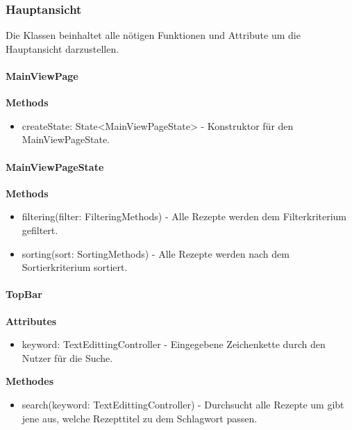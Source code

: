 \documentclass[parskip=full]{scrartcl}
\begin{document}
\newpage

\subsubsection{Hauptansicht}
        Die Klassen beinhaltet alle nötigen Funktionen und Attribute um die Hauptansicht darzustellen.\newline

        \paragraph{MainViewPage}
            \textbf{Methods}
                \begin{itemize}
                    \item createState: State<MainViewPageState> - Konstruktor für den MainViewPageState.
                \end{itemize}
                
        \paragraph{MainViewPageState}
            \textbf{Methods}
                \begin{itemize}
                    \item filtering(filter: FilteringMethods) - Alle Rezepte werden dem Filterkriterium gefiltert.
                    \item sorting(sort: SortingMethods) - Alle Rezepte werden nach dem Sortierkriterium sortiert.
                \end{itemize}

        \paragraph{TopBar}
            \textbf{Attributes}
                \begin{itemize}
                    \item keyword: TextEdittingController - Eingegebene Zeichenkette durch den Nutzer für die Suche.
                \end{itemize}
            \textbf{Methodes}
                \begin{itemize}
                    \item search(keyword: TextEdittingController) - Durchsucht alle Rezepte um gibt jene aus, welche Rezepttitel zu dem Schlagwort passen.
                \end{itemize}
                
\end{document}
